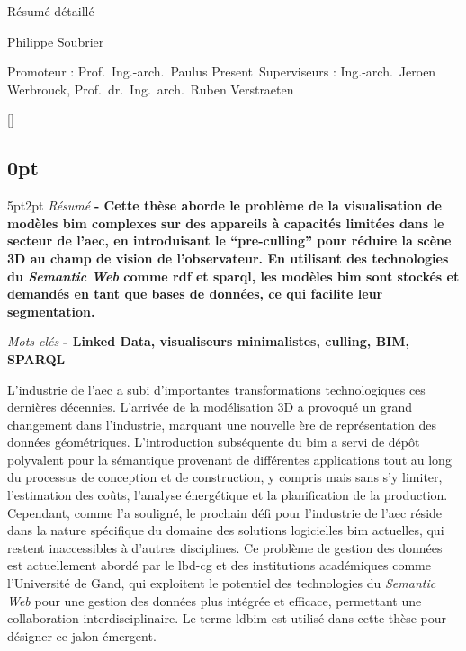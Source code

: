 \begin{center}
    \sffamily
    \huge Résumé détaillé

    \Large Philippe Soubrier

    \normalsize
    Promoteur : Prof.\ Ing.-arch.\ Paulus Present\
    Superviseurs : Ing.-arch.\ Jeroen Werbrouck, Prof.\ dr.\ Ing.\ arch.\ Ruben Verstraeten
\end{center}
\begin{refsection}
    []{}
    \begin{multicols}{2}
        \small
        \titlespacing\subsection{0pt}{5pt}{2pt}
        \emph{Résumé} \textbf{
            - Cette thèse aborde le problème de la visualisation de modèles \ac{bim} complexes sur des appareils à capacités limitées dans le secteur de l'\ac{aec}, en introduisant le \enquote{pre-culling} pour réduire la scène 3D au champ de vision de l'observateur. En utilisant des technologies du \emph{Semantic Web} comme \ac{rdf} et \ac{sparql}, les modèles \ac{bim} sont stockés et demandés en tant que bases de données, ce qui facilite leur segmentation.
        }

        \emph{Mots clés} \textbf{
            - Linked Data, visualiseurs minimalistes, culling, BIM, SPARQL
        }

        L'industrie de l'\ac{aec} a subi d'importantes transformations technologiques ces dernières décennies. L'arrivée de la modélisation 3D a provoqué un grand changement dans l'industrie, marquant une nouvelle ère de représentation des données géométriques. L'introduction subséquente du \ac{bim} a servi de dépôt polyvalent pour la sémantique provenant de différentes applications tout au long du processus de conception et de construction, y compris mais sans s'y limiter, l'estimation des coûts, l'analyse énergétique et la planification de la production. Cependant, comme \cite{Werbrouck2018} l'a souligné, le prochain défi pour l'industrie de l'\ac{aec} réside dans la nature spécifique du domaine des solutions logicielles \ac{bim} actuelles, qui restent inaccessibles à d'autres disciplines. Ce problème de gestion des données est actuellement abordé par le \ac{lbd-cg} et des institutions académiques comme l'Université de Gand, qui exploitent le potentiel des technologies du \emph{Semantic Web} pour une gestion des données plus intégrée et efficace, permettant une collaboration interdisciplinaire. Le terme \ac{ldbim} est utilisé dans cette thèse pour désigner ce jalon émergent.


\end{multicols}
\end{refsection}
